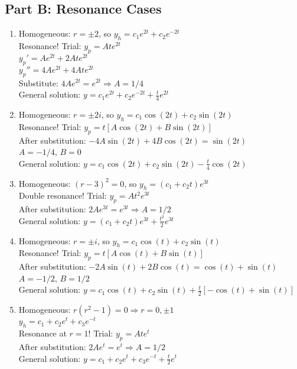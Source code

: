 \documentclass[12pt]{article}
\begin{document}
\subsection*{Part B: Resonance Cases}

\begin{enumerate}[resume]
\item Homogeneous: $r = \pm 2$, so $y_h = c_1e^{2t} + c_2e^{-2t}$\\
Resonance! Trial: $y_p = Ate^{2t}$\\
$y_p' = Ae^{2t} + 2Ate^{2t}$\\
$y_p'' = 4Ae^{2t} + 4Ate^{2t}$\\
Substitute: $4Ae^{2t} = e^{2t} \Rightarrow A = 1/4$\\
General solution: $y = c_1e^{2t} + c_2e^{-2t} + \frac{t}{4}e^{2t}$

\item Homogeneous: $r = \pm 2i$, so $y_h = c_1\cos(2t) + c_2\sin(2t)$\\
Resonance! Trial: $y_p = t[A\cos(2t) + B\sin(2t)]$\\
After substitution: $-4A\sin(2t) + 4B\cos(2t) = \sin(2t)$\\
$A = -1/4$, $B = 0$\\
General solution: $y = c_1\cos(2t) + c_2\sin(2t) - \frac{t}{4}\cos(2t)$

\item Homogeneous: $(r-3)^2 = 0$, so $y_h = (c_1 + c_2t)e^{3t}$\\
Double resonance! Trial: $y_p = At^2e^{3t}$\\
After substitution: $2Ae^{3t} = e^{3t} \Rightarrow A = 1/2$\\
General solution: $y = (c_1 + c_2t)e^{3t} + \frac{t^2}{2}e^{3t}$

\item Homogeneous: $r = \pm i$, so $y_h = c_1\cos(t) + c_2\sin(t)$\\
Resonance! Trial: $y_p = t[A\cos(t) + B\sin(t)]$\\
After substitution: $-2A\sin(t) + 2B\cos(t) = \cos(t) + \sin(t)$\\
$A = -1/2$, $B = 1/2$\\
General solution: $y = c_1\cos(t) + c_2\sin(t) + \frac{t}{2}[-\cos(t) + \sin(t)]$

\item Homogeneous: $r(r^2 - 1) = 0 \Rightarrow r = 0, \pm 1$\\
$y_h = c_1 + c_2e^t + c_3e^{-t}$\\
Resonance at $r = 1$! Trial: $y_p = Ate^t$\\
After substitution: $2Ae^t = e^t \Rightarrow A = 1/2$\\
General solution: $y = c_1 + c_2e^t + c_3e^{-t} + \frac{t}{2}e^t$
\end{enumerate}
\end{document}
